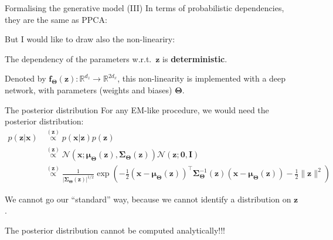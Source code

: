 \documentclass{beamer}
\newcommand{\MN}{{\mathcal N}}
\newcommand{\bs}[1]{\boldsymbol{#1}}
\begin{document}
\begin{frame}{Formalising the generative model (III)}
  In terms of probabilistic dependencies, they are the same as PPCA:\vspace{3mm}\\
  \vspace{3mm}

  But I would like to draw also the non-lineariry:\vspace{3mm}
  \vspace{3mm}
  
  The dependency of the parameters w.r.t.\ $\bs{z}$ is \textbf{deterministic}.\vspace{3mm}
  
  Denoted by $\bs{f}_{\bs{\Theta}}(\bs{z}):\mathbb{R}^{d_z}\rightarrow\mathbb{R}^{2d_x}$, this non-linearity is implemented with a deep network, with parameters (weights and biases) $\bs{\Theta}$.

\end{frame}

\begin{frame}{The posterior distribution}
 For any EM-like procedure, we would need the posterior distribution:
 \begin{align}
  p(\bs{z}|\bs{x}) & \stackrel{(\bs{z})}{\propto}  p(\bs{x}|\bs{z})p(\bs{z}) \\
  &\stackrel{(\bs{z})}{\propto} \MN(\bs{x};\bs{\mu}_{\bs{\Theta}}(\bs{z}),\bs{\Sigma}_{\bs{\Theta}}(\bs{z})) \MN(\bs{z};\bs{0},\bs{I}) \\
  &\stackrel{(\bs{z})}{\propto} \frac{1}{|\bs{\Sigma}_{\bs{\Theta}}(\bs{z})|^{1/2}} \exp\left(-\frac{1}{2} (\bs{x}-\bs{\mu}_{\bs{\Theta}}(\bs{z}))^\top \bs{\Sigma}_{\bs{\Theta}}^{-1}(\bs{z})(\bs{x}-\bs{\mu}_{\bs{\Theta}}(\bs{z})) - \frac{1}{2}\lVert\bs{z}\rVert^2 \right)
 \end{align}\pause
 
 We cannot go our ``standard'' way, because we cannot identify a distribution on $\bs{z}$.\vspace{3mm}
 
 The posterior distribution cannot be computed analytically!!!

\end{frame}
\end{document}
